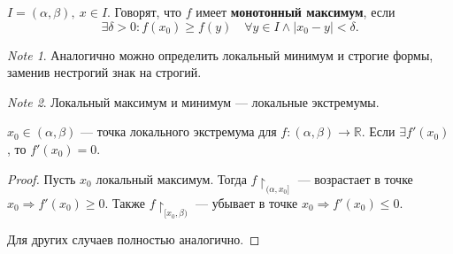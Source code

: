 \documentclass[11pt]{book}
\newcommand{\R}{\mathbb{R}}
\renewcommand{\le}{\leqslant}
\renewcommand{\ge}{\geqslant}
\theoremstyle{definition}
\theoremstyle{plain}
\theoremstyle{plain}
\theoremstyle{definition}
\theoremstyle{remark}
\newtheorem*{note}{Note}
\begin{document}
\begin{defn}
    $ I = (\alpha, \beta), ~ x \in I$. Говорят, что $ f$ имеет {\bf монотонный максимум}, если  \[
	\exists \delta >0 : f(x_0) \ge f(y) \quad \forall  y \in I \wedge  |x_0 - y| < \delta
    .\]
\end{defn}
\begin{note}
    Аналогично можно определить локальный минимум и строгие формы, заменив нестрогий знак на строгий.
\end{note}
\begin{note}
    Локальный максимум и минимум  --- локальные экстремумы.
\end{note}
\begin{thm}\label{th_loc_extr}
    $ x_0 \in (\alpha, \beta)$ --- точка локального экстремума для $ f: (\alpha, \beta) \to  \R$. Если $ \exists f'(x_0)$, то $ f'(x_0) = 0$.
\end{thm}
\begin{proof}
    Пусть $ x_0$ локальный  максимум. Тогда $ f\!\upharpoonright_{(\alpha, x_0]}$ --- возрастает в точке $ x_0 \Longrightarrow f'(x_0) \ge 0$. Также $ f\!\upharpoonright_{[x_0, \beta)}$ --- убывает в точке $ x_0 \Longrightarrow f'(x_0) \le 0$.

    Для других случаев полностью аналогично.
\end{proof}
\end{document}
